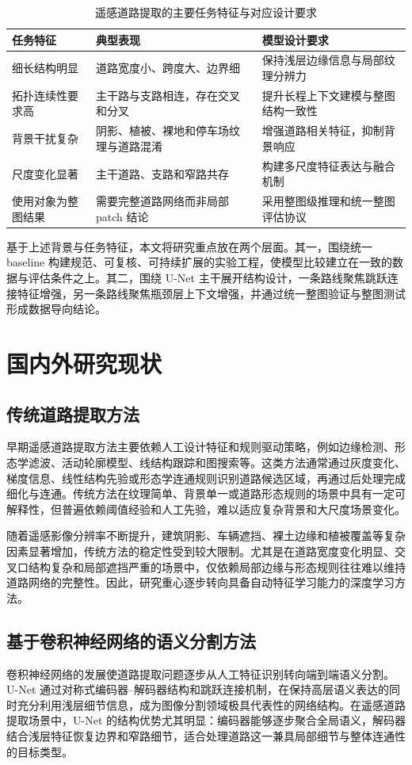 \begin{table}[htbp]
\centering
\caption{遥感道路提取的主要任务特征与对应设计要求}
\label{tab:v2-task-challenges}
\begin{tabular}{p{3.2cm}p{5.2cm}p{5.2cm}}
\toprule
任务特征 & 典型表现 & 模型设计要求 \\
\midrule
细长结构明显 & 道路宽度小、跨度大、边界细 & 保持浅层边缘信息与局部纹理分辨力 \\
拓扑连续性要求高 & 主干路与支路相连，存在交叉和分叉 & 提升长程上下文建模与整图结构一致性 \\
背景干扰复杂 & 阴影、植被、裸地和停车场纹理与道路混淆 & 增强道路相关特征，抑制背景响应 \\
尺度变化显著 & 主干道路、支路和窄路共存 & 构建多尺度特征表达与融合机制 \\
使用对象为整图结果 & 需要完整道路网络而非局部 patch 结论 & 采用整图级推理和统一整图评估协议 \\
\bottomrule
\end{tabular}
\end{table}

基于上述背景与任务特征，本文将研究重点放在两个层面。其一，围绕统一 baseline 构建规范、可复核、可持续扩展的实验工程，使模型比较建立在一致的数据与评估条件之上。其二，围绕 U-Net 主干展开结构设计，一条路线聚焦跳跃连接特征增强，另一条路线聚焦瓶颈层上下文增强，并通过统一整图验证与整图测试形成数据导向结论。

\section{国内外研究现状}
\subsection{传统道路提取方法}
早期遥感道路提取方法主要依赖人工设计特征和规则驱动策略，例如边缘检测、形态学滤波、活动轮廓模型、线结构跟踪和图搜索等。这类方法通常通过灰度变化、梯度信息、线性结构先验或形态学连通规则识别道路候选区域，再通过后处理完成细化与连通。传统方法在纹理简单、背景单一或道路形态规则的场景中具有一定可解释性，但普遍依赖阈值经验和人工先验，难以适应复杂背景和大尺度场景变化。

随着遥感影像分辨率不断提升，建筑阴影、车辆遮挡、裸土边缘和植被覆盖等复杂因素显著增加，传统方法的稳定性受到较大限制。尤其是在道路宽度变化明显、交叉口结构复杂和局部遮挡严重的场景中，仅依赖局部边缘与形态规则往往难以维持道路网络的完整性。因此，研究重心逐步转向具备自动特征学习能力的深度学习方法。

\subsection{基于卷积神经网络的语义分割方法}
卷积神经网络的发展使道路提取问题逐步从人工特征识别转向端到端语义分割。U-Net 通过对称式编码器--解码器结构和跳跃连接机制，在保持高层语义表达的同时充分利用浅层细节信息，成为图像分割领域极具代表性的网络结构\cite{unet2015}。在遥感道路提取场景中，U-Net 的结构优势尤其明显：编码器能够逐步聚合全局语义，解码器结合浅层特征恢复边界和窄路细节，适合处理道路这一兼具局部细节与整体连通性的目标类型。

